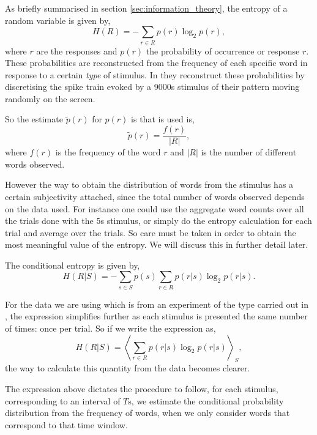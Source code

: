 \documentclass[10pt,a4paper]{book}
\begin{document}
As briefly summarised in section \ref{sec:information_theory}, the entropy of a random variable is given by,
\begin{equation}
H(R) = - \sum_{r \in R} p(r)\log_2 p(r),
\end{equation}
where $r$ are the responses and $p(r)$ the probability of occurrence or response $r$. These probabilities are reconstructed from the frequency of each specific word in response to a certain \emph{type} of stimulus. In \cite{deRuter97} they reconstruct these probabilities by discretising the spike train evoked by a 9000s stimulus of their pattern moving randomly on the screen.

So the estimate $\tilde{p}(r)$ for $p(r)$ is that is used is,
\begin{equation}
\tilde{p}(r) = \dfrac{f(r)}{|R|},
\end{equation}
where $f(r)$ is the frequency of the word $r$ and $|R|$ is the number of different words observed.

However the way to obtain the distribution of words from the stimulus has a certain subjectivity attached, since the total number of words observed depends on the data used. For instance one could use the aggregate word counts over all the trials done with the 5s stimulus, or simply do the entropy calculation for each trial and average over the trials. So care must be taken in order to obtain the most meaningful value of the entropy. We will discuss this in further detail later.

The conditional entropy is given by,
\begin{equation}
H(R|S) =  - \sum_{s \in S} p(s) \sum_{r \in R} p(r|s) \log_2 p(r|s).
\end{equation}

For the data we are using which is from an experiment of the type carried out in \cite{deRuyter97}, the expression simplifies further as each stimulus is presented the same number of times: once per trial. So if we write the expression as,
\begin{equation}
H(R|S) = \left\langle \sum_{r \in R} p(r|s)\log_2 p(r|s) \right\rangle_{S},
\end{equation}
the way to calculate this quantity from the data becomes clearer.

The expression above dictates the procedure to follow, for each stimulus, corresponding to an interval of $T \text{s}$, we estimate the conditional probability distribution from the frequency of words, when we only consider words that correspond to that time window.
\end{document}
